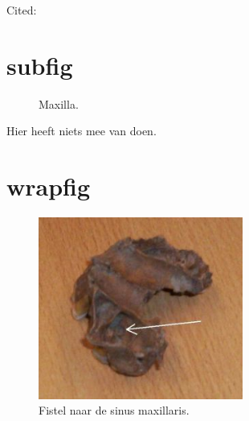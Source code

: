 Cited: \cite{laver,plutzer}

\section{subfig}

\begin{figure}[h]
	\centering
	\qquad
	\caption{Maxilla.}
	\label{fig:sk3_gebitten}
\end{figure}

Hier heeft \cite{laver} niets mee van doen.

\section{wrapfig}

\begin{figure}
	\centering
		\includegraphics[width=0.6\textwidth]{fistel1.jpg}
	\caption{Fistel naar de sinus maxillaris.}
	\label{fig:fistel}
\end{figure}

